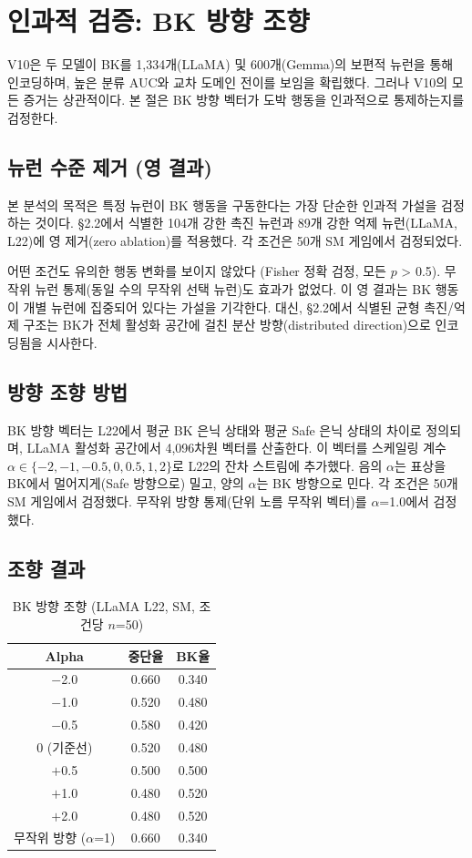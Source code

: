 \documentclass[11pt,a4paper]{article}
\begin{document}
\section{인과적 검증: BK 방향 조향}\label{sec:steering_ko}

V10은 두 모델이 BK를 1{,}334개(LLaMA) 및 600개(Gemma)의 보편적 뉴런을 통해 인코딩하며, 높은 분류 AUC와 교차 도메인 전이를 보임을 확립했다. 그러나 V10의 모든 증거는 상관적이다. 본 절은 BK 방향 벡터가 도박 행동을 인과적으로 통제하는지를 검정한다.

\subsection{뉴런 수준 제거 (영 결과)}

본 분석의 목적은 특정 뉴런이 BK 행동을 구동한다는 가장 단순한 인과적 가설을 검정하는 것이다. \S2.2에서 식별한 104개 강한 촉진 뉴런과 89개 강한 억제 뉴런(LLaMA, L22)에 영 제거(zero ablation)를 적용했다. 각 조건은 50개 SM 게임에서 검정되었다.

어떤 조건도 유의한 행동 변화를 보이지 않았다 (Fisher 정확 검정, 모든 $p$ > 0.5). 무작위 뉴런 통제(동일 수의 무작위 선택 뉴런)도 효과가 없었다. 이 영 결과는 BK 행동이 개별 뉴런에 집중되어 있다는 가설을 기각한다. 대신, \S2.2에서 식별된 균형 촉진/억제 구조는 BK가 전체 활성화 공간에 걸친 분산 방향(distributed direction)으로 인코딩됨을 시사한다.

\subsection{방향 조향 방법}

BK 방향 벡터는 L22에서 평균 BK 은닉 상태와 평균 Safe 은닉 상태의 차이로 정의되며, LLaMA 활성화 공간에서 4{,}096차원 벡터를 산출한다. 이 벡터를 스케일링 계수 $\alpha \in \{-2, -1, -0.5, 0, 0.5, 1, 2\}$로 L22의 잔차 스트림에 추가했다. 음의 $\alpha$는 표상을 BK에서 멀어지게(Safe 방향으로) 밀고, 양의 $\alpha$는 BK 방향으로 민다. 각 조건은 50개 SM 게임에서 검정했다. 무작위 방향 통제(단위 노름 무작위 벡터)를 $\alpha$=1.0에서 검정했다.

\subsection{조향 결과}

\begin{table}[H]
\centering
\caption{BK 방향 조향 (LLaMA L22, SM, 조건당 $n$=50)}
\begin{tabular}{ccc}
\toprule
\textbf{Alpha} & \textbf{중단율} & \textbf{BK율} \\
\midrule
$-$2.0 & 0.660 & 0.340 \\
$-$1.0 & 0.520 & 0.480 \\
$-$0.5 & 0.580 & 0.420 \\
0 (기준선) & 0.520 & 0.480 \\
$+$0.5 & 0.500 & 0.500 \\
$+$1.0 & 0.480 & 0.520 \\
$+$2.0 & 0.480 & 0.520 \\
무작위 방향 ($\alpha$=1) & 0.660 & 0.340 \\
\bottomrule
\end{tabular}
\end{table}
\end{document}

